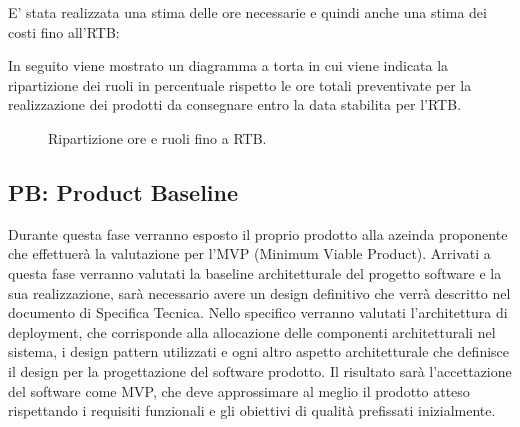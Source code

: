 E' stata realizzata una stima delle ore necessarie e quindi anche una stima dei costi fino all'RTB:
\begin{table}[!h]
    \centering
    \caption{Ripartizione ore e costi fino RTB.}
    \label{tab:stima_costi_RTB} 
\end{table}

In seguito viene mostrato un diagramma a torta in cui viene indicata la ripartizione dei ruoli in percentuale rispetto le ore totali preventivate per la realizzazione dei prodotti da consegnare entro la data stabilita per l'RTB.

\begin{figure}[!h]
    \centering
    \caption{Ripartizione ore e ruoli fino a RTB.}
    \label{fig:pie_ruoli_RTB}
\end{figure}

\subsection{PB: Product Baseline}
Durante questa fase verranno esposto il proprio prodotto alla azeinda proponente che effettuerà la valutazione per l'MVP (Minimum Viable Product).
Arrivati a questa fase verranno valutati la baseline architetturale del progetto software e la sua realizzazione, sarà necessario avere un design definitivo 
che verrà descritto nel documento di Specifica Tecnica.
Nello specifico verranno valutati l'architettura di deployment, che corrisponde alla allocazione delle componenti architetturali nel sistema, 
i design pattern utilizzati e ogni altro aspetto architetturale che definisce il design per la progettazione del software prodotto.
Il risultato sarà l'accettazione del software come MVP, che deve approssimare al meglio il prodotto atteso rispettando i requisiti funzionali 
e gli obiettivi di qualità prefissati inizialmente.